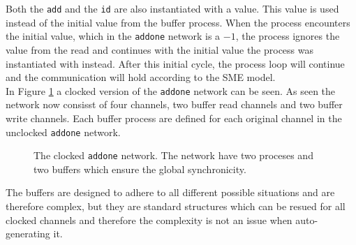 Both the \texttt{add} and the \texttt{id} are also instantiated with a value. This value is used instead of the initial value from the buffer process. When the process encounters the initial value, which in the \texttt{addone} network is a $-1$, the process ignores the value from the read and continues with the initial value the process was instantiated with instead. After this initial cycle, the process loop will continue and the communication will hold according to the SME model.\\

In Figure \ref{fig:addone_clocked} a clocked version of the \texttt{addone} network can be seen. As seen the network now consisst of four channels, two buffer read channels and two buffer write channels. Each buffer process are defined for each original channel in the unclocked \texttt{addone} network. \\

\begin{figure}
\centering
{}
\caption{The clocked \texttt{addone} network. The network have two proceses and two buffers which ensure the global synchronicity.}
\label{fig:addone_clocked}
\end{figure}



The buffers are designed to adhere to all different possible situations and are therefore complex, but they are standard structures which can be resued for all clocked channels and therefore the complexity is not an issue when auto-generating it.



